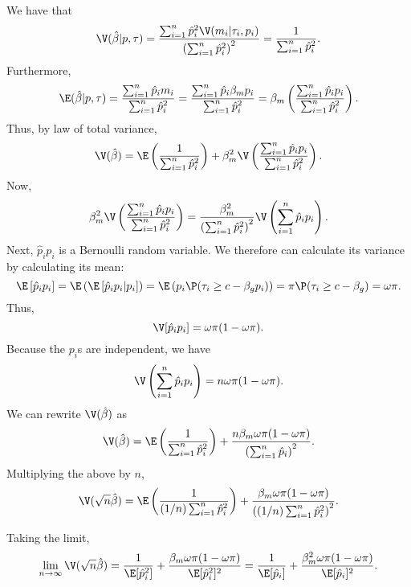 \documentclass[12pt]{article}
\begin{document}
We have that
$$ \V(\hat{\beta}| p, \tau ) = \frac{ \sum_{i=1}^n \hat{p}_i^2 \V(m_i | \tau_i, p_i)}{ \left( \sum_{i=1}^n \hat{p}^2_i \right)^2 } = \frac{1}{\sum_{i=1}^n \hat{p}_i^2}.$$ Furthermore,
$$\E(\hat{\beta} | p, \tau)  = \frac{ \sum_{i=1}^n \hat{p}_i m_i}{ \sum_{i=1}^n \hat{p}^2_i} = \frac{\sum_{i=1}^n \hat{p}_i \beta_m p_i }{\sum_{i=1}^n \hat{p}_i^2} = \beta_m \left( \frac{\sum_{i=1}^n \hat{p}_i p_i}{\sum_{i=1}^n \hat{p}_i^2} \right) .$$ Thus, by law of total variance,
$$ \V(\hat{\beta}) = \E \left(\frac{ 1 }{ \sum_{i=1}^n \hat{p}_i^2}\right) + \beta_m^2 \V\left(\frac{\sum_{i=1}^n \hat{p}_i p_i}{\sum_{i=1}^n \hat{p}_i^2} \right).$$
Now,
$$\beta_m^2 \V\left(\frac{\sum_{i=1}^n \hat{p}_i p_i}{\sum_{i=1}^n \hat{p}_i^2}\right) = \frac{\beta_m^2}{ \left(\sum_{i=1}^n \hat{p}_i^2 \right)^2 } \V \left( \sum_{i=1}^n \hat{p}_i p_i \right).$$
Next, $\hat{p}_i p_i$ is a Bernoulli random variable. We therefore can calculate its variance by calculating its mean:
$$
\E\left[ \hat{p}_i p_i \right]  = \E\left( \E\left[ \hat{p}_i p_i | p_i \right]\right) = \E \left( p_i \P( \tau_i \geq c - \beta_g p_i ) \right) = \pi\P( \tau_i \geq c - \beta_g) = \omega \pi.
$$
Thus, $$\V[\hat{p}_ip_i] = \omega \pi (1 - \omega \pi).$$ Because the $p_i$s are independent, we have
$$ \V \left( \sum_{i=1}^n \hat{p}_i p_i \right) = n \omega \pi (1 - \omega \pi).$$
We can rewrite $\V(\hat{\beta})$ as 
$$ \V(\hat{\beta}) = \E \left( \frac{1}{\sum_{i=1}^n \hat{p}_i^2} \right) + \frac{n \beta_m \omega \pi (1 - \omega \pi)}{ \left(\sum_{i=1}^n \hat{p}_i \right)^2}.$$ Multiplying the above by $n$,
$$ \V(\sqrt{n} \hat{\beta}) = \E \left( \frac{1}{ (1/n) \sum_{i=1}^n \hat{p}_i^2 } \right) + \frac{ \beta_m \omega \pi (1 - \omega \pi) }{ \left( (1/n) \sum_{i=1}^n \hat{p}_i^2 \right)^2}.$$

Taking the limit,
$$ \lim_{n \to \infty} \V(\sqrt{n} \hat{\beta}) = \frac{1}{\E[ \hat{p}_i^2]} + \frac{ \beta_m \omega \pi (1 - \omega \pi) }{ \E[\hat{p}_i^2]^2} = \frac{1}{\E[ \hat{p}_i]} + \frac{\beta_m^2 \omega \pi (1 - \omega \pi)}{\E[\hat{p}_i]^2}.$$
\end{document}
